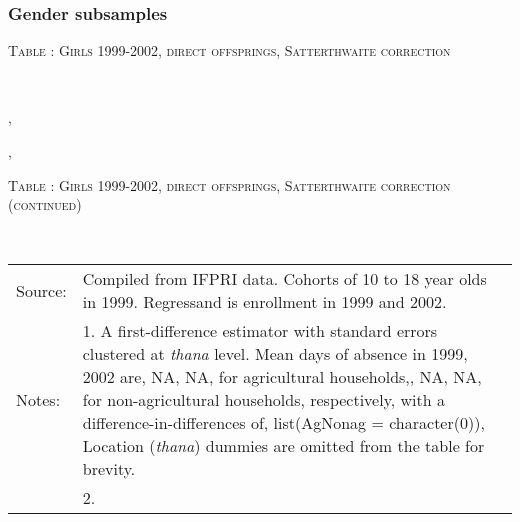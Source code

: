 \clearpage
\subsubsection{Gender subsamples}


\renewcommand{\arraystretch}{.8}


\begin{table}\hfil\textsc{\footnotesize Table \thetable: Girls 1999-2002, direct offsprings, Satterthwaite correction\label{zEm.1999.10.sameN}}\\\setlength{\tabcolsep}{1pt}\renewcommand{\arraystretch}{.675}\hspace{-2em}\hfil{}\\\renewcommand{\arraystretch}{1}\end{table}, \addtocounter{table}{-1}, \begin{table}\hfil\textsc{\footnotesize Table \thetable: Girls 1999-2002, direct offsprings, Satterthwaite correction (continued)\label{zEm.1999.10.sameN}}\\\setlength{\tabcolsep}{1pt}\renewcommand{\arraystretch}{.675}\hspace{-2em}\hfil{}\\\renewcommand{\arraystretch}{1}\hfil\begin{tabular}{>{\hfill\scriptsize}p{1cm}<{}>{\scriptsize}p{12cm}<{\hfill}} Source:& Compiled from IFPRI data. Cohorts of 10 to 18 year olds in 1999. Regressand is enrollment in 1999 and 2002. \\[-1ex] Notes:& 1. A first-difference estimator with standard errors clustered at \textit{thana} level. Mean days of absence in 1999, 2002 are, NA, NA, for agricultural households,, NA, NA, for non-agricultural households, respectively, with a difference-in-differences of, list(AgNonag = character(0)), Location (\textit{thana}) dummies are omitted from the table for brevity. \\ & 2.   \end{tabular} \end{table}

